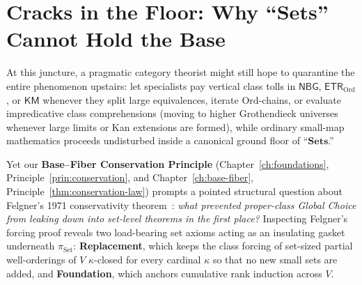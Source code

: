 \begin{itemize}[leftmargin=1.5em]
\end{itemize}

\section{\texorpdfstring{Cracks in the Floor: Why ``$\mathbf{Sets}$'' Cannot Hold the Base}{Cracks in the Floor: Why "Sets" Cannot Hold the Base}}\label{sec:cracks-in-the-floor}

At this juncture, a pragmatic category theorist might still hope to quarantine the entire phenomenon upstairs: let specialists pay vertical class tolls in $\mathsf{NBG}$, $\mathsf{ETR}_{\mathrm{Ord}}$, or $\mathsf{KM}$ whenever they split large equivalences, iterate $\mathrm{Ord}$-chains, or evaluate impredicative class comprehensions (moving to higher Grothendieck universes whenever large limits or Kan extensions are formed), while ordinary small-map mathematics proceeds undisturbed inside a canonical ground floor of ``$\mathbf{Sets}$.''

Yet our \textbf{Base--Fiber Conservation Principle} (Chapter~\ref{ch:foundations}, Principle~\ref{prin:conservation}, and Chapter~\ref{ch:base-fiber}, Principle~\ref{thm:conservation-law}) prompts a pointed structural question about Felgner's 1971 conservativity theorem~\cite{Felgner71}: \emph{what prevented proper-class Global Choice from leaking down into set-level theorems in the first place?} Inspecting Felgner's forcing proof reveals two load-bearing set axioms acting as an insulating gasket underneath $\pi_{\mathrm{Set}}$: \textbf{Replacement}, which keeps the class forcing of set-sized partial well-orderings of $V$ $\kappa$-closed for every cardinal $\kappa$ so that no new small sets are added, and \textbf{Foundation}, which anchors cumulative rank induction across $V$.

